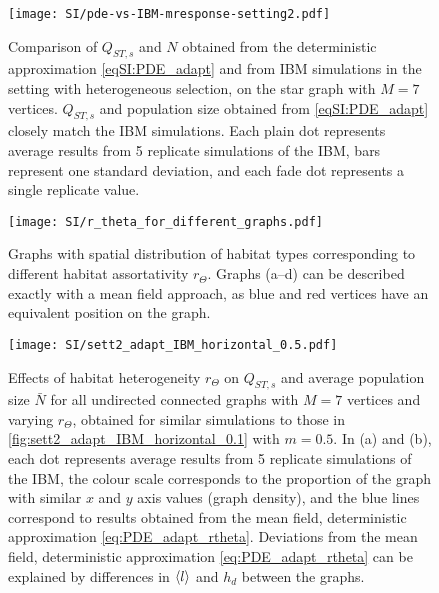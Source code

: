 
\begin{figure}[t]
  \centering
      \texttt{[image: SI/pde-vs-IBM-mresponse-setting2.pdf]}
    \caption{ Comparison of $Q_{ST,s}$ and $N$ obtained from the deterministic approximation \cref{eqSI:PDE_adapt} and from IBM simulations in the setting with heterogeneous selection, on the star graph with $M=7$ vertices. $Q_{ST,s}$ and population size obtained from \cref{eqSI:PDE_adapt} closely match the IBM simulations. Each plain dot represents average results from 5 replicate simulations of the IBM, bars represent one standard deviation, and each fade dot represents a single replicate value.}
    \label{figSI:pde-vs-IBM-mresponse-setting2}
\end{figure}
\FloatBarrier

\begin{figure}[t]
  \centerline{
      \texttt{[image: SI/r\_theta\_for\_different\_graphs.pdf]} 
  }
  \caption{Graphs with spatial distribution of habitat types corresponding to different habitat assortativity $r_\Theta$. Graphs (a–d) can be described exactly with a mean field approach, as blue and red vertices have an equivalent position on the graph.}
  \label{figSI:graph_rtheta}
\end{figure}
\FloatBarrier

\begin{figure}[t]
  \centerline{
      \texttt{[image: SI/sett2\_adapt\_IBM\_horizontal\_0.5.pdf]} 
  }
  \caption{Effects of habitat heterogeneity $r_\Theta$ on $Q_{ST,s}$ and average population size $\bar{N}$ for all undirected connected graphs with $M=7$ vertices and varying $r_\Theta$, obtained for similar simulations to those in \cref{fig:sett2_adapt_IBM_horizontal_0.1} with $m = 0.5$. In (a) and (b), each dot represents average results from 5 replicate simulations of the IBM, the colour scale corresponds to the proportion of the graph with similar $x$ and $y$ axis values (graph density), and the blue lines correspond to results obtained from the mean field, deterministic approximation \cref{eq:PDE_adapt_rtheta}. Deviations from the mean field, deterministic approximation \cref{eq:PDE_adapt_rtheta} can be explained by differences in $\langle l \rangle$ and $h_d$ between the graphs.}
  \label{figSI:sett2_adapt_IBM_horizontal_0.5}
\end{figure}
\FloatBarrier


